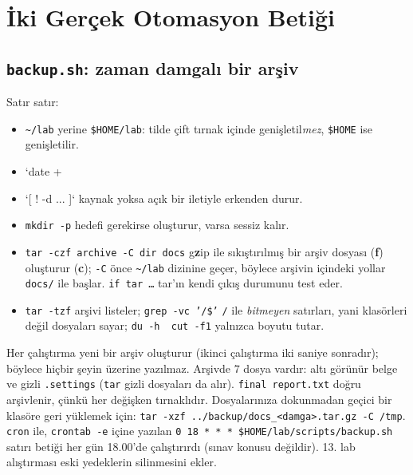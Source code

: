 \documentclass[11pt,a4paper]{article}
\newcommand{\cmd}[1]{\texttt{#1}}
\begin{document}
\section{İki Gerçek Otomasyon Betiği}

\subsection{\texttt{backup.sh}: zaman damgalı bir arşiv}



Satır satır:
\begin{itemize}
  \item \texttt{\textasciitilde/lab} yerine \texttt{\$HOME/lab}: tilde çift tırnak içinde genişletil\emph{mez}, \texttt{\$HOME} ise genişletilir.
  \item `date +%
  \item `[ ! -d ... ]` kaynak yoksa açık bir iletiyle erkenden durur.
  \item \cmd{mkdir -p} hedefi gerekirse oluşturur, varsa sessiz kalır.
  \item \cmd{tar -czf archive -C dir docs} g\textbf{z}ip ile sıkıştırılmış bir arşiv dosyası (\textbf{f}) oluşturur (\textbf{c}); \texttt{-C} önce \texttt{\textasciitilde/lab} dizinine geçer, böylece arşivin içindeki yollar \texttt{docs/} ile başlar. \texttt{if tar \ldots} tar'ın kendi çıkış durumunu test eder.
  \item \cmd{tar -tzf} arşivi listeler; \cmd{grep -vc '/\$'} \texttt{/} ile \emph{bitmeyen} satırları, yani klasörleri değil dosyaları sayar; \cmd{du -h \textbar\ cut -f1} yalnızca boyutu tutar.
\end{itemize}



Her çalıştırma yeni bir arşiv oluşturur (ikinci çalıştırma iki saniye sonradır); böylece hiçbir şeyin üzerine yazılmaz. Arşivde $7$ dosya vardır: altı görünür belge ve gizli \texttt{.settings} (\cmd{tar} gizli dosyaları da alır). \texttt{final report.txt} doğru arşivlenir, çünkü her değişken tırnaklıdır. Dosyalarınıza dokunmadan geçici bir klasöre geri yüklemek için: \cmd{tar -xzf ../backup/docs\_<damga>.tar.gz -C /tmp}. \cmd{cron} ile, \cmd{crontab -e} içine yazılan \texttt{0 18 * * * \$HOME/lab/scripts/backup.sh} satırı betiği her gün 18.00'de çalıştırırdı (sınav konusu değildir). 13. lab alıştırması eski yedeklerin silinmesini ekler.
\end{document}
